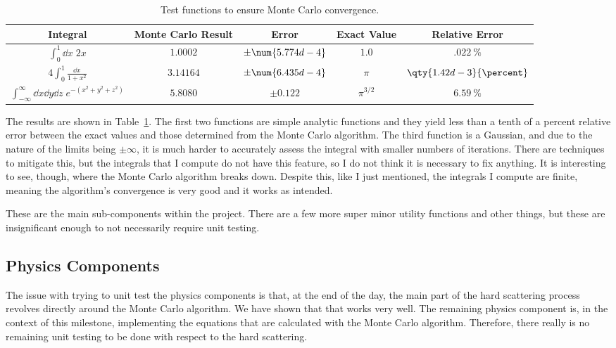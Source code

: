 \renewcommand{\arraystretch}{1.5}
\begin{table}[ht]
  \centering
  \begin{tabular}{|c|c|c|c|c|}
    \hline
    Integral & Monte Carlo Result & Error & Exact Value & Relative Error \\ \hline
    $\int_0^1\dd x \; 2x$ & $1.0002$ & $\pm \num{5.774d-4}$ & $1.0$ & $\qty{.022}{\percent}$ \\ \hline
    $4\int_0^1 \frac{\dd x}{1+x^2}$ & $3.14164$ & $\pm \num{6.435d-4}$ & $\pi$ & $\qty{1.42d-3}{\percent}$ \\ \hline
    $\int_{-\infty}^\infty \dd x\dd y\dd z \; e^{-(x^2+y^2+z^2)}$ & $5.8080$ & $\pm 0.122$ & $\pi^{3/2}$ & $\qty{6.59}{\percent}$ \\ \hline
  \end{tabular}
  \caption{Test functions to ensure Monte Carlo convergence.}
  \label{tbl:monte-carlo-tests}
\end{table}
\renewcommand{\arraystretch}{1.0}

The results are shown in Table~\ref{tbl:monte-carlo-tests}. The first two functions are simple analytic functions and they yield less than a tenth of a percent relative error between the exact values and those determined from the Monte Carlo algorithm. The third function is a Gaussian, and due to the nature of the limits being $\pm\infty$, it is much harder to accurately assess the integral with smaller numbers of iterations. There are techniques to mitigate this, but the integrals that I compute do not have this feature, so I do not think it is necessary to fix anything. It is interesting to see, though, where the Monte Carlo algorithm breaks down. Despite this, like I just mentioned, the integrals I compute are finite, meaning the algorithm's convergence is very good and it works as intended.

These are the main sub-components within the project. There are a few more super minor utility functions and other things, but these are insignificant enough to not necessarily require unit testing.

\subsection{Physics Components}

The issue with trying to unit test the physics components is that, at the end of the day, the main part of the hard scattering process revolves directly around the Monte Carlo algorithm. We have shown that that works very well. The remaining physics component is, in the context of this milestone, implementing the equations that are calculated with the Monte Carlo algorithm. Therefore, there really is no remaining unit testing to be done with respect to the hard scattering.

